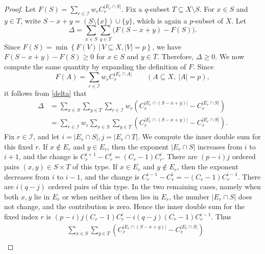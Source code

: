 \documentclass[twoside,12pt]{article}
\numberwithin{equation}{section}
\begin{document}
\begin{proof}
Let $F(S)=\sum_{r\in\mathcal I}w_r C_r^{|E_r\cap S|}$.
Fix a $q$-subset $T\subseteq X\setminus S$. For $x\in S$ and $y\in T$, write
        $S-x+y=(S\setminus\{x\})\cup\{y\}$, which is again a $p$-subset of $X$.  
Let
\begin{equation}\label{delta}
\Delta
        =
        \sum_{x\in S}\sum_{y\in T}
        \bigl(F(S-x+y)-F(S)\bigr).
\end{equation}
Since $F(S)=\min \left\{F(V)\,|\, V\subseteq X, |V|=p\right\}$, we have
        $F(S-x+y)-F(S)\ge0$ for $x\in S$ and $y\in T$.
Therefore, $\Delta\ge0$.
We now compute the same quantity by expanding the definition of $F$. Since
\[
        F(A)=\sum_{r\in\mathcal I}w_r C_r^{|E_r\cap A|}
        \qquad(A\subseteq X,\ |A|=p),
\]
it follows from \eqref{delta} that
\begin{equation}\label{euquation-2-2}
\begin{aligned}
        \Delta
        &=
        \sum_{x\in S}\sum_{y\in T}
        \sum_{r\in\mathcal I}
        w_r
        \left(
        C_r^{|E_r\cap(S-x+y)|}
        -
        C_r^{|E_r\cap S|}
        \right)  \\[0.2cm]
        &=
        \sum_{r\in\mathcal I}
        w_r
        \sum_{x\in S}\sum_{y\in T}
        \left(
        C_r^{|E_r\cap(S-x+y)|}
        -
        C_r^{|E_r\cap S|}
        \right).
\end{aligned}
\end{equation}
Fix $r\in\mathcal I$, and let
$i=|E_r\cap S|,
 j=|E_r\cap T|$.
We compute the inner double sum for this fixed $r$. If
$x\notin E_r$ and $y\in E_r$, then the exponent
$|E_r\cap S|$ increases from $i$ to $i+1$, and the change is
$C_r^{i+1}-C_r^i=(C_r-1)C_r^i$.
There are $(p-i)j$ ordered pairs $(x,y)\in S\times T$ of this type.
If $x\in E_r$ and $y\notin E_r$, then the exponent decreases from $i$ to
$i-1$, and the change is
$C_r^{i-1}-C_r^i=-(C_r-1)C_r^{i-1}$.
There are $i(q-j)$ ordered pairs of this type.
In the two remaining cases, namely when both $x,y$ lie in $E_r$ or when
neither of them lies in $E_r$, the number $|E_r\cap S|$ does not change,
and the contribution is zero.  Hence the inner double sum for the fixed
index $r$ is
$(p-i)j(C_r-1)C_r^i
        -
        i(q-j)(C_r-1)C_r^{i-1}$.
Thus
\begin{equation}\label{e2-3}
\begin{aligned}
        &\sum_{x\in S}\sum_{y\in T}
        \left(
        C_r^{|E_r\cap(S-x+y)|}
        -
        C_r^{|E_r\cap S|}
        \right)       \\

\end{aligned}
\end{equation}
\end{proof}
\end{document}
